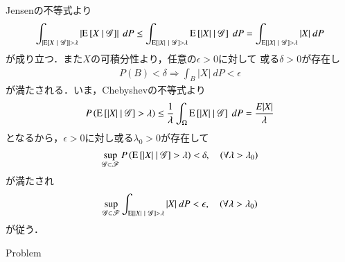	\begin{prf}
		Jensenの不等式より
		\begin{align}
			\int_{\left| \operatorname{E} \left[ X \ \middle|\ \mathscr{G} \right] \right| > \lambda} \left| \operatorname{E} \left[ X \ \middle|\ \mathscr{G} \right] \right|\ dP
			\leq \int_{\operatorname{E} \left[ |X| \ \middle|\ \mathscr{G} \right] > \lambda} \operatorname{E} \left[ |X| \ \middle|\ \mathscr{G} \right]\ dP
			= \int_{\operatorname{E} \left[ |X| \ \middle|\ \mathscr{G} \right] > \lambda} |X|\ dP
		\end{align}
		が成り立つ．また$X$の可積分性より，任意の$\epsilon > 0$に対して
		或る$\delta > 0$が存在し
		\begin{align}
			P(B) < \delta \Rightarrow \int_B |X|\ dP < \epsilon
		\end{align}
		が満たされる．いま，Chebyshevの不等式より
		\begin{align}
			P\left( \cexp{|X|}{\mathscr{G}} > \lambda \right)
			\leq \frac{1}{\lambda} \int_\Omega \cexp{|X|}{\mathscr{G}}\ dP
			= \frac{E|X|}{\lambda}
		\end{align}
		となるから，$\epsilon > 0$に対し或る$\lambda_0 > 0$が存在して
		\begin{align}
			\operatorname*{sup}_{\mathscr{G} \subset \mathscr{F}} P\left( \operatorname{E} \left[ |X| \ \middle|\ \mathscr{G} \right] > \lambda \right)
			< \delta,
			\quad (\forall \lambda > \lambda_0)
		\end{align}
		が満たされ
		\begin{align}
			\operatorname*{sup}_{\mathscr{G} \subset \mathscr{F}} \int_{\operatorname{E} \left[ |X| \ \middle|\ \mathscr{G} \right] > \lambda}|X|\ dP
			< \epsilon,
			\quad (\forall \lambda > \lambda_0)
		\end{align}
		が従う．
		\QED
	\end{prf}
	
	\begin{itembox}[l]{Problem}
		
	\end{itembox}
	